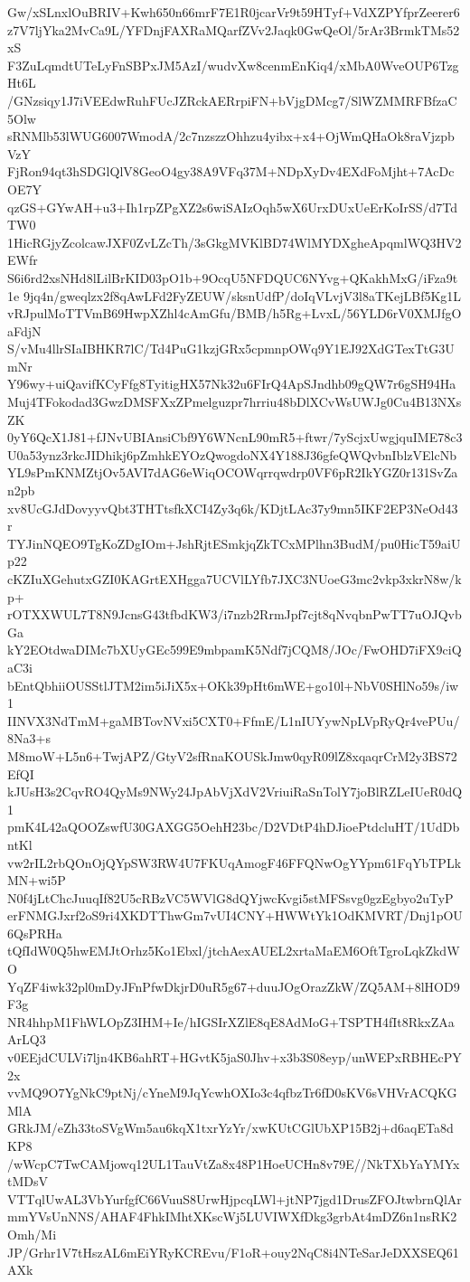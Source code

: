 Gw/xSLnxlOuBRIV+Kwh650n66mrF7E1R0jcarVr9t59HTyf+VdXZPYfprZeerer6
z7V7ljYka2MvCa9L/YFDnjFAXRaMQarfZVv2Jaqk0GwQeOl/5rAr3BrmkTMs52xS
F3ZuLqmdtUTeLyFnSBPxJM5AzI/wudvXw8cenmEnKiq4/xMbA0WveOUP6TzgHt6L
/GNzsiqy1J7iVEEdwRuhFUcJZRckAERrpiFN+bVjgDMcg7/SlWZMMRFBfzaC5Olw
sRNMlb53lWUG6007WmodA/2c7nzszzOhhzu4yibx+x4+OjWmQHaOk8raVjzpbVzY
FjRon94qt3hSDGlQlV8GeoO4gy38A9VFq37M+NDpXyDv4EXdFoMjht+7AcDcOE7Y
qzGS+GYwAH+u3+Ih1rpZPgXZ2s6wiSAIzOqh5wX6UrxDUxUeErKoIrSS/d7TdTW0
1HicRGjyZcolcawJXF0ZvLZcTh/3sGkgMVKlBD74WlMYDXgheApqmlWQ3HV2EWfr
S6i6rd2xsNHd8lLilBrKID03pO1b+9OcqU5NFDQUC6NYvg+QKakhMxG/iFza9t1e
9jq4n/gweqlzx2f8qAwLFd2FyZEUW/sksnUdfP/doIqVLvjV3l8aTKejLBf5Kg1L
vRJpulMoTTVmB69HwpXZhl4cAmGfu/BMB/h5Rg+LvxL/56YLD6rV0XMJfgOaFdjN
S/vMu4llrSIaIBHKR7lC/Td4PuG1kzjGRx5cpmnpOWq9Y1EJ92XdGTexTtG3UmNr
Y96wy+uiQavifKCyFfg8TyitigHX57Nk32u6FIrQ4ApSJndhb09gQW7r6gSH94Ha
Muj4TFokodad3GwzDMSFXxZPmelguzpr7hrriu48bDlXCvWsUWJg0Cu4B13NXsZK
0yY6QcX1J81+fJNvUBIAnsiCbf9Y6WNcnL90mR5+ftwr/7yScjxUwgjquIME78c3
U0a53ynz3rkcJIDhikj6pZmhkEYOzQwogdoNX4Y188J36gfeQWQvbnIblzVElcNb
YL9sPmKNMZtjOv5AVI7dAG6eWiqOCOWqrrqwdrp0VF6pR2IkYGZ0r131SvZan2pb
xv8UcGJdDovyyvQbt3THTtsfkXCI4Zy3q6k/KDjtLAc37y9mn5IKF2EP3NeOd43r
TYJinNQEO9TgKoZDgIOm+JshRjtESmkjqZkTCxMPlhn3BudM/pu0HicT59aiUp22
cKZIuXGehutxGZI0KAGrtEXHgga7UCVlLYfb7JXC3NUoeG3mc2vkp3xkrN8w/kp+
rOTXXWUL7T8N9JcnsG43tfbdKW3/i7nzb2RrmJpf7cjt8qNvqbnPwTT7uOJQvbGa
kY2EOtdwaDIMc7bXUyGEc599E9mbpamK5Ndf7jCQM8/JOc/FwOHD7iFX9ciQaC3i
bEntQbhiiOUSStlJTM2im5iJiX5x+OKk39pHt6mWE+go10l+NbV0SHlNo59s/iw1
IINVX3NdTmM+gaMBTovNVxi5CXT0+FfmE/L1nIUYywNpLVpRyQr4vePUu/8Na3+s
M8moW+L5n6+TwjAPZ/GtyV2sfRnaKOUSkJmw0qyR09lZ8xqaqrCrM2y3BS72EfQI
kJUsH3s2CqvRO4QyMs9NWy24JpAbVjXdV2VriuiRaSnTolY7joBlRZLeIUeR0dQ1
pmK4L42aQOOZswfU30GAXGG5OehH23bc/D2VDtP4hDJioePtdcluHT/1UdDbntKl
vw2rIL2rbQOnOjQYpSW3RW4U7FKUqAmogF46FFQNwOgYYpm61FqYbTPLkMN+wi5P
N0f4jLtChcJuuqIf82U5cRBzVC5WVlG8dQYjwcKvgi5stMFSsvg0gzEgbyo2uTyP
erFNMGJxrf2oS9ri4XKDTThwGm7vUI4CNY+HWWtYk1OdKMVRT/Dnj1pOU6QsPRHa
tQfIdW0Q5hwEMJtOrhz5Ko1Ebxl/jtchAexAUEL2xrtaMaEM6OftTgroLqkZkdWO
YqZF4iwk32pl0mDyJFnPfwDkjrD0uR5g67+duuJOgOrazZkW/ZQ5AM+8lHOD9F3g
NR4hhpM1FhWLOpZ3IHM+Ie/hIGSIrXZlE8qE8AdMoG+TSPTH4fIt8RkxZAaArLQ3
v0EEjdCULVi7ljn4KB6ahRT+HGvtK5jaS0Jhv+x3b3S08eyp/unWEPxRBHEcPY2x
vvMQ9O7YgNkC9ptNj/cYneM9JqYcwhOXIo3c4qfbzTr6fD0sKV6sVHVrACQKGMlA
GRkJM/eZh33toSVgWm5au6kqX1txrYzYr/xwKUtCGlUbXP15B2j+d6aqETa8dKP8
/wWcpC7TwCAMjowq12UL1TauVtZa8x48P1HoeUCHn8v79E//NkTXbYaYMYxtMDsV
VTTqlUwAL3VbYurfgfC66VuuS8UrwHjpcqLWl+jtNP7jgd1DrusZFOJtwbrnQlAr
mmYVsUnNNS/AHAF4FhkIMhtXKscWj5LUVIWXfDkg3grbAt4mDZ6n1nsRK2Omh/Mi
JP/Grhr1V7tHszAL6mEiYRyKCREvu/F1oR+ouy2NqC8i4NTeSarJeDXXSEQ61AXk
